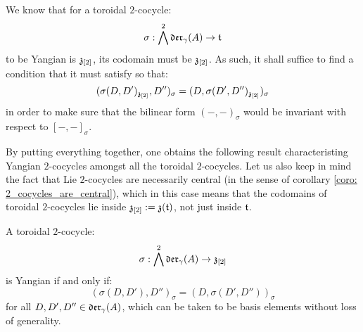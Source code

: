         \begin{remark} \label{remark: yangian_criterion_for_toroidal_cocycles}
            We know that for a toroidal $2$-cocycle:
                $$\sigma: \bigwedge^2 \mathfrak{der}_{\gamma}(A) \to \mathfrak{t}$$
            to be Yangian is $\mathfrak{z}_{[2]}$, its codomain must be $\mathfrak{z}_{[2]}$. As such, it shall suffice to find a condition that it must satisfy so that:
                $$(\sigma(D, D')_{\mathfrak{z}_{[2]}}, D'')_{\sigma} = (D, \sigma(D', D'')_{\mathfrak{z}_{[2]}})_{\sigma}$$
            in order to make sure that the bilinear form $(-, -)_{\sigma}$ would be invariant with respect to $[-, -]_{\sigma}$.
        \end{remark}
        By putting everything together, one obtains the following result characteristing Yangian $2$-cocycles amongst all the toroidal $2$-cocycles. Let us also keep in mind the fact that Lie $2$-cocycles are necessarily central (in the sense of corollary \ref{coro: 2_cocycles_are_central}), which in this case means that the codomains of toroidal $2$-cocycles lie inside $\mathfrak{z}_{[2]} := \mathfrak{z}(\mathfrak{t})$, not just inside $\mathfrak{t}$.
        \begin{theorem} \label{theorem: yangian_criterion_for_toroidal_cocycles}
            A toroidal $2$-cocycle:
                $$\sigma: \bigwedge^2 \mathfrak{der}_{\gamma}(A) \to \mathfrak{z}_{[2]}$$
            is Yangian if and only if:
                $$(\sigma(D, D'), D'')_{\sigma} = (D, \sigma(D', D''))_{\sigma}$$
            for all $D, D', D'' \in \mathfrak{der}_{\gamma}(A)$, which can be taken to be basis elements without loss of generality. 
        \end{theorem}

